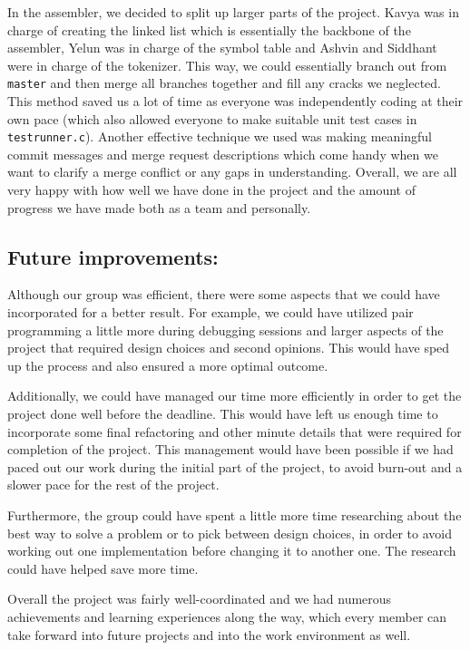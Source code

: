 \documentclass[a4paper]{article}
\begin{document}
In the assembler, we decided to split up larger parts of the project. Kavya was in charge of creating the linked list which is essentially the backbone of the assembler, Yelun was in charge of the symbol table and Ashvin and Siddhant were in charge of the tokenizer. This way, we could essentially branch out from \verb|master| and then merge all branches together and fill any cracks we neglected. This method saved us a lot of time as everyone was independently coding at their own pace (which also allowed everyone to make suitable unit test cases in \verb|testrunner.c|). Another effective technique we used was making meaningful commit messages and merge request descriptions which come handy when we want to clarify a merge conflict or any gaps in understanding. Overall, we are all very happy with how well we have done in the project and the amount of progress we have made both as a team and personally.

\subsection{Future improvements:}
Although our group was efficient, there were some aspects that we could have incorporated for a better result. For example, we could have utilized pair programming a little more during debugging sessions and larger aspects of the project that required design choices and second opinions. This would have sped up the process and also ensured a more optimal outcome.

Additionally, we could have managed our time more efficiently in order to get the project done well before the deadline. This would have left us enough time to incorporate some final refactoring and other minute details that were required for completion of the project. This management would have been possible if we had paced out our work during the initial part of the project, to avoid burn-out and a slower pace for the rest of the project. 

Furthermore, the group could have spent a little more time researching about the best way to solve a problem or to pick between design choices, in order to avoid working out one implementation before changing it to another one. The research could have helped save more time.

Overall the project was fairly well-coordinated and we had numerous achievements and learning experiences along the way, which every member can take forward into future projects and into the work environment as well.
\end{document}
